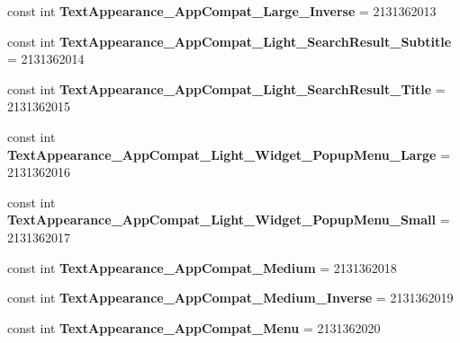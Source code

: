 \begin{DoxyCompactItemize}
const int {\bfseries Text\+Appearance\+\_\+\+App\+Compat\+\_\+\+Large\+\_\+\+Inverse} = 2131362013
\item 
\mbox{\label{class_sample_app_1_1_droid_1_1_resource_1_1_style_a1f6cbe802f0813a9a90952d2d806e139}} 
const int {\bfseries Text\+Appearance\+\_\+\+App\+Compat\+\_\+\+Light\+\_\+\+Search\+Result\+\_\+\+Subtitle} = 2131362014
\item 
\mbox{\label{class_sample_app_1_1_droid_1_1_resource_1_1_style_a75e17d7e883e6830b6e5d4e84e8b3cdd}} 
const int {\bfseries Text\+Appearance\+\_\+\+App\+Compat\+\_\+\+Light\+\_\+\+Search\+Result\+\_\+\+Title} = 2131362015
\item 
\mbox{\label{class_sample_app_1_1_droid_1_1_resource_1_1_style_aeae3e75c28129609877438ba7576d01d}} 
const int {\bfseries Text\+Appearance\+\_\+\+App\+Compat\+\_\+\+Light\+\_\+\+Widget\+\_\+\+Popup\+Menu\+\_\+\+Large} = 2131362016
\item 
\mbox{\label{class_sample_app_1_1_droid_1_1_resource_1_1_style_ae525f72e2ba2c396a3ee1eb26d2a4781}} 
const int {\bfseries Text\+Appearance\+\_\+\+App\+Compat\+\_\+\+Light\+\_\+\+Widget\+\_\+\+Popup\+Menu\+\_\+\+Small} = 2131362017
\item 
\mbox{\label{class_sample_app_1_1_droid_1_1_resource_1_1_style_a5f23b97518676a59ecbdc125765e9827}} 
const int {\bfseries Text\+Appearance\+\_\+\+App\+Compat\+\_\+\+Medium} = 2131362018
\item 
\mbox{\label{class_sample_app_1_1_droid_1_1_resource_1_1_style_a314520965dd336db622b45112ffd1e99}} 
const int {\bfseries Text\+Appearance\+\_\+\+App\+Compat\+\_\+\+Medium\+\_\+\+Inverse} = 2131362019
\item 
\mbox{\label{class_sample_app_1_1_droid_1_1_resource_1_1_style_a1c86b81ab8ed0eb2ac8648be53f30b7f}} 
const int {\bfseries Text\+Appearance\+\_\+\+App\+Compat\+\_\+\+Menu} = 2131362020
\item 

\end{DoxyCompactItemize}
